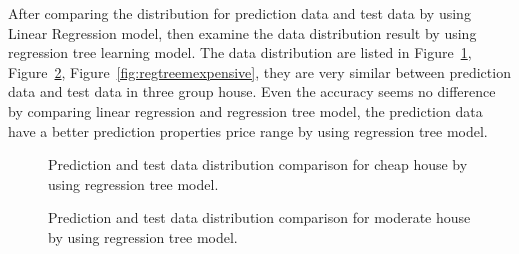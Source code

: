 \documentclass[11pt,a4paper]{article}
\begin{document}
\FloatBarrier
After comparing the distribution for prediction data and test data by using Linear Regression model, then examine the data distribution result by using regression tree learning model. The data distribution are listed in Figure~\ref{fig:regtreecheap}, Figure~\ref{fig:regtreemoderate}, Figure~\ref{fig:regtreemexpensive}, they are very similar between prediction data and test data in three group house. Even the accuracy seems no difference by comparing linear regression and regression tree model, the prediction data have a better prediction properties price range by using regression tree model.

\begin{figure}[h]
    \centering
    \hfill%
    \caption{Prediction and test data distribution comparison for cheap house by using regression tree model.}
    \label{fig:regtreecheap}
\end{figure}
\begin{figure}[h]
    \centering
    \hfill%
    \caption{Prediction and test data distribution comparison for moderate house by using regression tree model.}
    \label{fig:regtreemoderate}
\end{figure}
\end{document}

